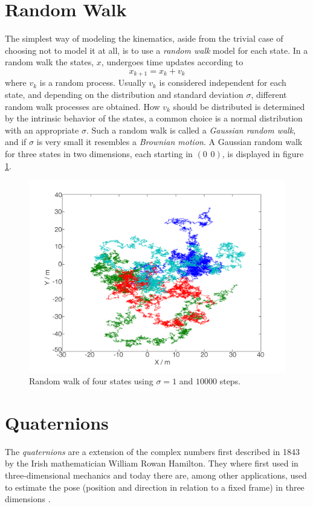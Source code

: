 \documentclass{LTHthesis}
\begin{document}
\section{Random Walk}
%
The simplest way of modeling the kinematics, aside from the trivial case of choosing not to model it at all, is to use a \emph{random walk} model for each state. In a random walk the states, $x$, undergoes time updates according to
%
\begin{equation}
x_{k+1} = x_k + v_k
\end{equation}      
%
where $v_k$ is a random process. Usually $v_k$ is considered independent for each state, and depending on the distribution and standard deviation $\sigma$, different random walk processes are obtained. How $v_k$ should be distributed is determined by the intrinsic behavior of the states, a common choice is a normal distribution with an appropriate $\sigma$. Such a random walk is called a \emph{Gaussian random walk}, and if $\sigma$ is very small it resembles a \emph{Brownian motion}. A Gaussian random walk for three states in two dimensions, each starting in $(0\hspace{5pt}0)$, is displayed in figure \ref{rand_walk}. 
%
\begin{figure}[!hbt]

\includegraphics[width=1\textwidth ]{images/kinematic/rand_walk}
\caption{Random walk of four states using $\sigma = 1$ and $10000$ steps.}\label{rand_walk}
\end{figure}
%
\section{Quaternions}
%
The \emph{quaternions} are a extension of the complex numbers first described in 1843 by the Irish mathematician William Rowan Hamilton. They where first used in three-dimensional mechanics and today there are, among other applications, used to estimate the pose (position and direction in relation to a fixed frame) in three dimensions \cite{mann13}.
%
\end{document}
